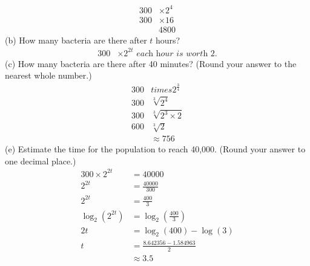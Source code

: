 \documentclass{article}
\begin{document}
\begin{equation}
\begin{split}
    300 & \times 2^4\\
    300 & \times 16\\
    & 4800
\end{split}
\end{equation}
(b) How many bacteria are there after $t$ hours?
\begin{equation}
\begin{split}
    300 & \times 2^{2t} \textit{ each hour is worth 2.}
\end{split}
\end{equation}
(c) How many bacteria are there after 40 minutes? (Round your answer to the nearest whole number.)\\
\begin{equation}
\begin{split}
    300 & times 2^{\frac{3}{4}}\\
    300 & \sqrt[3]{2^4}\\
    300 & \sqrt[3]{2^3 \times 2}\\
    600 & \sqrt[3]{2}\\
    & \approx 756
\end{split}
\end{equation}
(e) Estimate the time for the population to reach 40,000. (Round your answer to one decimal place.)\\
\begin{equation}
\begin{split}
    300 \times 2^{2t} & = 40000\\
    2^{2t} & = \frac{40000}{300}\\
    2^{2t} & = \frac{400}{3}\\
    \log_2(2^{2t}) & = \log_2(\frac{400}{3})\\
    2t & = \log_2(400) - \log(3)\\
    t & = \frac{8.642356 - 1.584963}{2}\\
    & \approx 3.5 
\end{split}
\end{equation}
\end{document}
